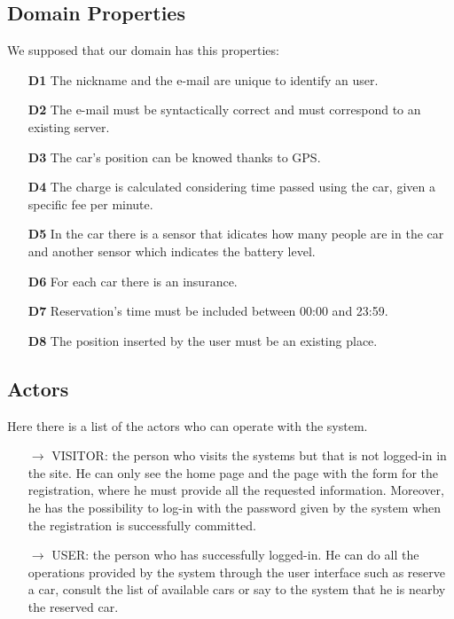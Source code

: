 \subsection{Domain Properties} \label{subsec:domain}
We supposed that our domain has this properties:
\begin{itemize}
\item[\textbf{D1}]The nickname and the e-mail are unique to identify an user.
\item[\textbf{D2}]The e-mail must be syntactically correct and must correspond to an existing server.
\item[\textbf{D3}]The car's position can be knowed thanks to GPS.
\item[\textbf{D4}]The charge is calculated considering time passed using the car, given a specific fee per minute.
\item[\textbf{D5}]In the car there is a sensor that idicates how many people %
 are in the car and another sensor which indicates the battery level.
\item[\textbf{D6}]For each car there is an insurance.
\item[\textbf{D7}]Reservation's time must be included between 00:00 and 23:59.
\item[\textbf{D8}]The position inserted by the user must be an existing place.
\end{itemize}


\subsection{Actors} \label{subsec:actors}
Here there is a list of the actors who can operate with the system.
\begin{itemize}
\item[\textbf{$\rightarrow$}] VISITOR: the person who visits the systems but that is not logged-in in the site. He can only see the home page and the page with the form for the registration, where he must provide all the requested information. Moreover, he has the possibility to log-in with the password given by the system when the registration is successfully committed. 
\item[\textbf{$\rightarrow$}] USER: the person who has successfully logged-in. He can do all the operations provided by the system through the user interface such as reserve a car, consult the list of available cars or say to the system that he is nearby the reserved car. 
\end{itemize}

